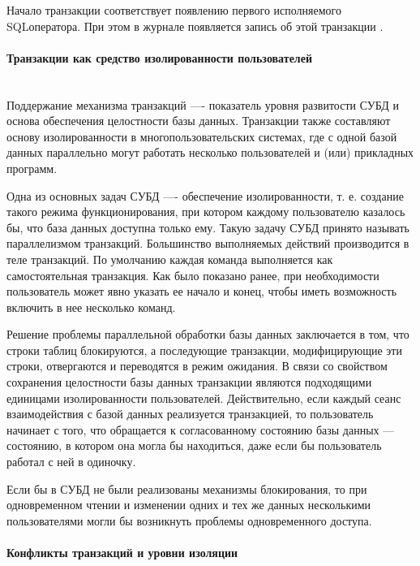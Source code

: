 Начало транзакции соответствует появлению первого исполняемого SQLоператора. При этом в журнале появляется запись об этой транзакции \autocite{Karpova2009}.

\paragraph{Транзакции как средство изолированности пользователей} ~\\

Поддержание механизма транзакций —- показатель уровня развитости СУБД и основа обеспечения целостности базы данных. Транзакции также составляют основу изолированности в многопользовательских системах, где с одной базой данных параллельно могут работать несколько пользователей и (или) прикладных программ. 


Одна из основных задач СУБД —- обеспечение изолированности, т. е. создание такого режима функционирования, при котором каждому пользователю казалось бы, что база данных доступна только ему. Такую задачу СУБД принято называть параллелизмом транзакций. Большинство выполняемых действий производится в теле транзакций. По умолчанию каждая команда выполняется как самостоятельная транзакция. Как было показано ранее, при необходимости пользователь может явно указать ее начало и конец, чтобы иметь возможность включить в нее несколько команд.


Решение проблемы параллельной обработки базы данных заключается в том, что строки таблиц блокируются, а последующие транзакции, модифицирующие эти строки, отвергаются и переводятся в режим ожидания. В связи со свойством сохранения целостности базы данных транзакции являются подходящими единицами изолированности пользователей. Действительно, если каждый сеанс взаимодействия с базой данных реализуется транзакцией, то пользователь начинает с того, что обращается к согласованному состоянию базы данных — состоянию, в котором она могла бы находиться, даже если бы пользователь работал с ней в одиночку.


Если бы в СУБД не были реализованы механизмы блокирования, то при одновременном чтении и изменении одних и тех же данных несколькими пользователями могли бы возникнуть проблемы одновременного доступа.


\paragraph{Конфликты транзакций и уровни изоляции} ~\\

